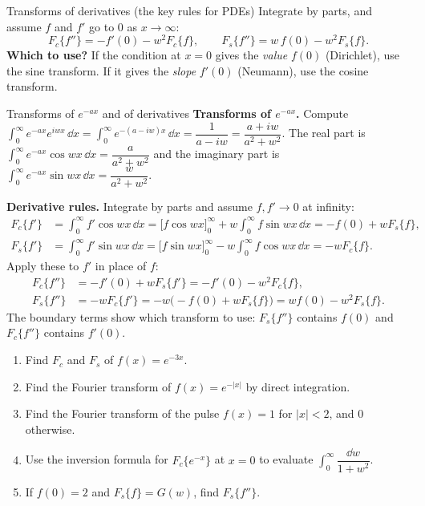 \begin{defbox}{Transforms of derivatives (the key rules for PDEs)}
Integrate by parts, and assume $f$ and $f'$ go to 0 as $x\to\infty$:
\[ F_c\{f''\} = -f'(0) - w^2F_c\{f\}, \qquad F_s\{f''\} = w\,f(0) - w^2F_s\{f\}. \]
\textbf{Which to use?} If the condition at $x=0$ gives the \emph{value} $f(0)$ (Dirichlet), use the sine transform. If it gives the \emph{slope} $f'(0)$ (Neumann), use the cosine transform.
\end{defbox}

\begin{derivbox}{Transforms of $e^{-ax}$ and of derivatives}
\textbf{Transforms of $e^{-ax}$.} Compute $\int_0^\infty e^{-ax}e^{iwx}\,\dd x = \int_0^\infty e^{-(a-iw)x}\,\dd x = \dfrac{1}{a-iw} = \dfrac{a+iw}{a^2+w^2}$. The real part is $\int_0^\infty e^{-ax}\cos wx\,\dd x = \dfrac{a}{a^2+w^2}$ and the imaginary part is $\int_0^\infty e^{-ax}\sin wx\,\dd x = \dfrac{w}{a^2+w^2}$.

\textbf{Derivative rules.} Integrate by parts and assume $f,f'\to0$ at infinity:
\begin{align*}
F_c\{f'\} &= \int_0^\infty f'\cos wx\,\dd x = \Big[f\cos wx\Big]_0^\infty + w\int_0^\infty f\sin wx\,\dd x = -f(0) + wF_s\{f\},\\
F_s\{f'\} &= \int_0^\infty f'\sin wx\,\dd x = \Big[f\sin wx\Big]_0^\infty - w\int_0^\infty f\cos wx\,\dd x = -wF_c\{f\}.
\end{align*}
Apply these to $f'$ in place of $f$:
\begin{align*}
F_c\{f''\} &= -f'(0) + wF_s\{f'\} = -f'(0) - w^2F_c\{f\},\\
F_s\{f''\} &= -wF_c\{f'\} = -w\big(-f(0) + wF_s\{f\}\big) = wf(0) - w^2F_s\{f\}.
\end{align*}
The boundary terms show which transform to use: $F_s\{f''\}$ contains $f(0)$ and $F_c\{f''\}$ contains $f'(0)$.
\end{derivbox}

\begin{practicebox}
\begin{enumerate}
  \item Find $F_c$ and $F_s$ of $f(x) = e^{-3x}$.
  \item Find the Fourier transform of $f(x) = e^{-|x|}$ by direct integration.
  \item Find the Fourier transform of the pulse $f(x) = 1$ for $|x|<2$, and $0$ otherwise.
  \item Use the inversion formula for $F_c\{e^{-x}\}$ at $x=0$ to evaluate $\displaystyle\int_0^\infty\dfrac{\dd w}{1+w^2}$.
  \item If $f(0)=2$ and $F_s\{f\}=G(w)$, find $F_s\{f''\}$.
\end{enumerate}
\end{practicebox}

